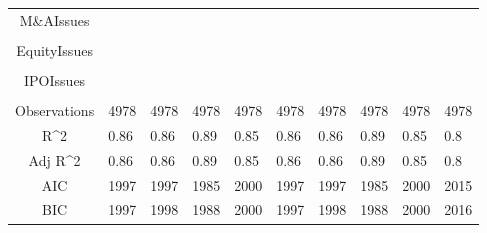 \documentclass{article}
\begin{document}
\begin{table}[H]
\begin{tabular}{|clllllllll|}
  M\&AIssues &  &  &  &  &  &  &  &  &  \\ 
   &  &  &  &  &  &  &  &  &  \\ 
  EquityIssues &  &  &  &  &  &  &  &  &  \\ 
   &  &  &  &  &  &  &  &  &  \\ 
  IPOIssues &  &  &  &  &  &  &  &  &  \\ 
   &  &  &  &  &  &  &  &  &  \\ 
  \hline 
 Observations & 4978 & 4978 & 4978 & 4978 & 4978 & 4978 & 4978 & 4978 & 4978 \\ 
  R^2 & 0.86 & 0.86 & 0.89 & 0.85 & 0.86 & 0.86 & 0.89 & 0.85 & 0.8 \\ 
  Adj R^2 & 0.86 & 0.86 & 0.89 & 0.85 & 0.86 & 0.86 & 0.89 & 0.85 & 0.8 \\ 
  AIC & 1997 & 1997 & 1985 & 2000 & 1997 & 1997 & 1985 & 2000 & 2015 \\ 
  BIC & 1997 & 1998 & 1988 & 2000 & 1997 & 1998 & 1988 & 2000 & 2016 \\ 
   \hline
\end{tabular}
 
\end{table}
\end{document}
